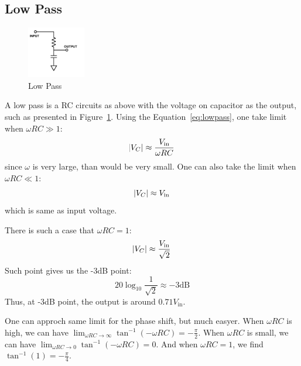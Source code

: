 \documentclass[aps,prl,reprint]{revtex4-1}
\begin{document}
    \subsection{Low Pass}
        \begin{figure}[h]
            \centering
            \includegraphics[width=1in]{image/lowpass.pdf}
            \caption{Low Pass}
            \label{fig:lowpass}
        \end{figure}
        A low pass is a RC circuits as above with the voltage on capacitor as the output, such as presented in Figure~\ref{fig:lowpass}. Using the Equation~\ref{eq:lowpass}, one take limit when $\omega R C \gg 1$:
        \[
        \abs{V_C} \approx \frac{V_\text{in}}{\omega R C}
        \]
        since $\omega$ is very large, than  would be very small. One can also take the limit when $\omega R C \ll 1$:
        \[
        \abs{V_C} \approx V_\text{in}
        \]
        which is same as input voltage.

        There is such a case that $\omega R C = 1$:
        \[
        \abs{V_C} \approx \frac{V_\text{in}}{\sqrt{2}}
        \]
        Such point gives us the -3dB point:
        \[
        20 \log_{10} \frac{1}{\sqrt{2}} \approx -3\text{dB}
        \]
        Thus, at -3dB point, the output is around $0.71V_\text{in}$.

        One can approch same limit for the phase shift, but much easyer. When $\omega R C$ is high, we can have $\lim_{\omega R C \rightarrow \infty} \tan^{-1} (-\omega R C) = -\frac{\pi}{2}$. When $\omega R C$ is small, we can have $\lim_{\omega R C \rightarrow 0} \tan^{-1} (-\omega R C) = 0$. And when $\omega R C = 1$, we find $ \tan^{-1} (1) = -\frac{\pi}{4}$.
\end{document}

